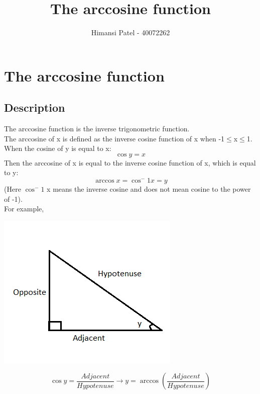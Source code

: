 \documentclass[a4paper,10pt]{report}
\title{The arccosine function}
\author{Himansi Patel - 40072262}
\begin{document}
\section{The arccosine function}
\subsection{Description}

The arccosine function is the inverse trigonometric function.\\
The arccosine of x is defined as the inverse cosine function of x when -1$\leq$x$\leq$1.
When the cosine of y is equal to x:
\begin{equation}
\cos y = x
\end{equation}
Then the arccosine of x is equal to the inverse cosine function of x, which is equal to y:
\begin{equation}
\arccos x = \cos^-1 x = y 
\end{equation}
(Here $\cos^-1$ x means the inverse cosine and does not mean cosine to the power of -1).\cite{rapidtables}\\
For example,\\
\begin{minipage}{0.30\textwidth}
    \centering
    \includegraphics[width=\textwidth]{Firstpic.PNG}
    \end{minipage}
    \begin{minipage}{0.70\textwidth}
    \begin{equation}
\cos y = \frac{Adjacent}{Hypotenuse} \rightarrow y=\arccos(\frac{Adjacent}{Hypotenuse})
\end{equation}
    \end{minipage}
\end{document}
